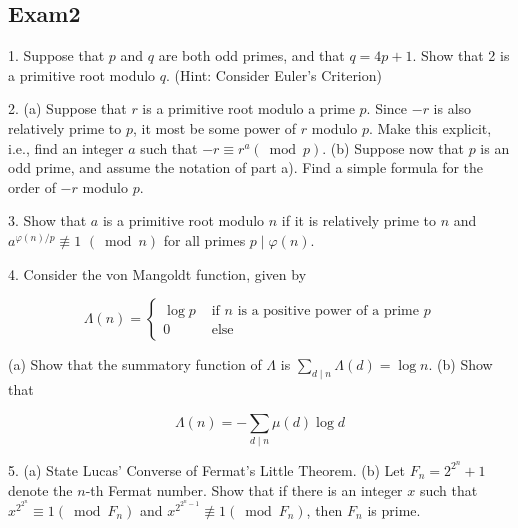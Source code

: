 \begin{enumerate}
\newpage 
\section{Exam2}


1. Suppose that $p$ and $q$ are both odd primes, and that $q=4 p+1$. Show that 2 is a primitive root modulo $q$. (Hint: Consider Euler's Criterion)


2. (a) Suppose that $r$ is a primitive root modulo a prime $p$. Since $-r$ is also relatively prime to $p$, it most be some power of $r$ modulo $p$. Make this explicit, i.e., find an integer $a$ such that $-r \equiv r^a(\bmod p)$.
(b) Suppose now that $p$ is an odd prime, and assume the notation of part a). Find a simple formula for the order of $-r$ modulo $p$.


3. Show that $a$ is a primitive root modulo $n$ if it is relatively prime to $n$ and $a^{\varphi(n) / p} \not \equiv 1$ $(\bmod n)$ for all primes $p \mid \varphi(n)$.



4. Consider the von Mangoldt function, given by

$$
\Lambda(n)= \begin{cases}\log p & \text { if } n \text { is a positive power of a prime } p \\ 0 & \text { else }\end{cases}
$$

(a) Show that the summatory function of $\Lambda$ is $\sum_{d \mid n} \Lambda(d)=\log n$.
(b) Show that

$$
\Lambda(n)=-\sum_{d \mid n} \mu(d) \log d
$$

5. (a) State Lucas' Converse of Fermat's Little Theorem.
(b) Let $F_n=2^{2^n}+1$ denote the $n$-th Fermat number. Show that if there is an integer $x$ such that $x^{2^{2^n}} \equiv 1\left(\bmod F_n\right)$ and $x^{2^{2^n-1}} \not \equiv 1\left(\bmod F_n\right)$, then $F_n$ is prime.









\end{enumerate}
